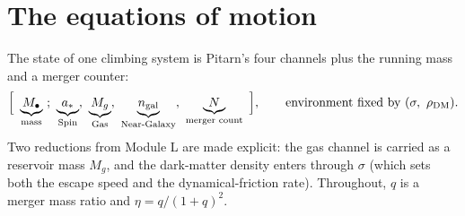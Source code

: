 \documentclass[11pt]{article}
\newcommand{\Mbh}{M_{\bullet}}
\begin{document}
\section{The equations of motion}
The state of one climbing system is Pitarn's four channels plus the running mass and a merger counter:
\begin{equation}
\Big[\ \underbrace{\Mbh}_{\text{mass}}\ ;\ \underbrace{a_\ast}_{\text{Spin}},\ \underbrace{M_g}_{\text{Gas}},\ \underbrace{n_{\rm gal}}_{\text{Near-Galaxy}},\ \underbrace{N}_{\text{merger count}}\ \Big],\qquad \text{environment fixed by }(\sigma,\ \rho_{\rm DM}).
\end{equation}
Two reductions from Module L are made explicit: the gas channel is carried as a reservoir mass $M_g$, and the dark-matter density enters through $\sigma$ (which sets both the escape speed and the dynamical-friction rate). Throughout, $q$ is a merger mass ratio and $\eta=q/(1+q)^2$.
\end{document}
